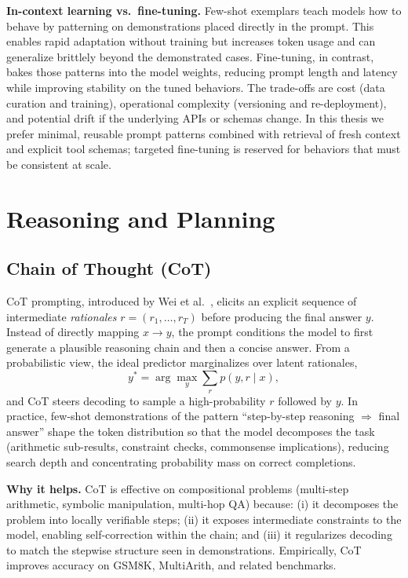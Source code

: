 \textbf{In-context learning vs.\ fine-tuning.} Few-shot exemplars teach models how to behave by patterning on demonstrations placed directly in the prompt. This enables rapid adaptation without training but increases token usage and can generalize brittlely beyond the demonstrated cases. Fine-tuning, in contrast, bakes those patterns into the model weights, reducing prompt length and latency while improving stability on the tuned behaviors. The trade-offs are cost (data curation and training), operational complexity (versioning and re-deployment), and potential drift if the underlying APIs or schemas change. In this thesis we prefer minimal, reusable prompt patterns combined with retrieval of fresh context and explicit tool schemas; targeted fine-tuning is reserved for behaviors that must be consistent at scale.

\section{Reasoning and Planning}
\subsection{Chain of Thought (CoT)}
CoT prompting, introduced by Wei et al.~\cite{chainofthought}, elicits an explicit sequence of intermediate \emph{rationales} $r=(r_1,\ldots,r_T)$ before producing the final answer $y$. Instead of directly mapping $x\to y$, the prompt conditions the model to first generate a plausible reasoning chain and then a concise answer. From a probabilistic view, the ideal predictor marginalizes over latent rationales,
\begin{equation}
 y^* = \arg\max_y \sum_r p(y,r\mid x),
\end{equation}
and CoT steers decoding to sample a high-probability $r$ followed by $y$. In practice, few-shot demonstrations of the pattern ``step-by-step reasoning $\Rightarrow$ final answer'' shape the token distribution so that the model decomposes the task (arithmetic sub-results, constraint checks, commonsense implications), reducing search depth and concentrating probability mass on correct completions.

	\textbf{Why it helps.} CoT is effective on compositional problems (multi-step arithmetic, symbolic manipulation, multi-hop QA) because: (i) it decomposes the problem into locally verifiable steps; (ii) it exposes intermediate constraints to the model, enabling self-correction within the chain; and (iii) it regularizes decoding to match the stepwise structure seen in demonstrations. Empirically, CoT improves accuracy on GSM8K, MultiArith, and related benchmarks.

